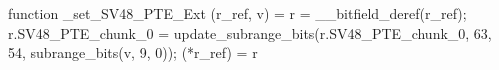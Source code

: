 function _set_SV48_PTE_Ext (r_ref, v) = {
    r = __bitfield_deref(r_ref);
    r.SV48_PTE_chunk_0 = update_subrange_bits(r.SV48_PTE_chunk_0, 63, 54, subrange_bits(v, 9, 0));
    (*r_ref) = r
}
